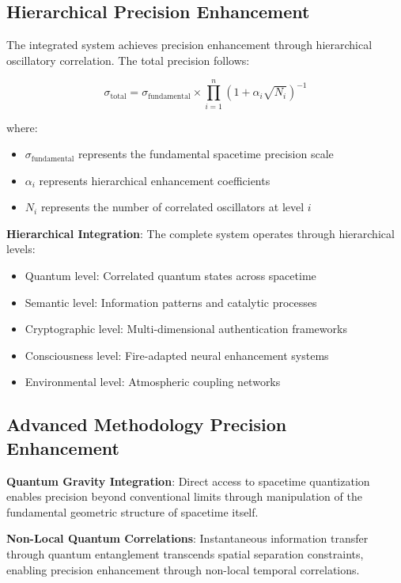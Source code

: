 \documentclass[11pt]{article}
\theoremstyle{remark}
\begin{document}
\subsection{Hierarchical Precision Enhancement}

The integrated system achieves precision enhancement through hierarchical oscillatory correlation. The total precision follows:

$$\sigma_{\text{total}} = \sigma_{\text{fundamental}} \times \prod_{i=1}^{n}(1 + \alpha_i\sqrt{N_i})^{-1}$$

where:
\begin{itemize}
\item $\sigma_{\text{fundamental}}$ represents the fundamental spacetime precision scale
\item $\alpha_i$ represents hierarchical enhancement coefficients
\item $N_i$ represents the number of correlated oscillators at level $i$
\end{itemize}

\textbf{Hierarchical Integration}: The complete system operates through hierarchical levels:
\begin{itemize}
\item Quantum level: Correlated quantum states across spacetime
\item Semantic level: Information patterns and catalytic processes
\item Cryptographic level: Multi-dimensional authentication frameworks
\item Consciousness level: Fire-adapted neural enhancement systems
\item Environmental level: Atmospheric coupling networks
\end{itemize}

\subsection{Advanced Methodology Precision Enhancement}

\textbf{Quantum Gravity Integration}: Direct access to spacetime quantization enables precision beyond conventional limits through manipulation of the fundamental geometric structure of spacetime itself.

\textbf{Non-Local Quantum Correlations}: Instantaneous information transfer through quantum entanglement transcends spatial separation constraints, enabling precision enhancement through non-local temporal correlations.
\end{document}

